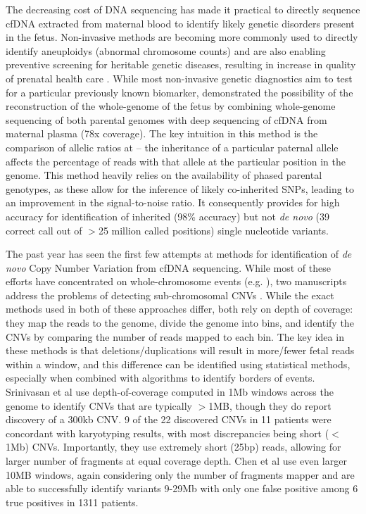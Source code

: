 The decreasing cost of DNA sequencing has made it practical to directly sequence cfDNA extracted from maternal blood to identify likely genetic disorders present in the fetus.  Non-invasive methods are becoming more commonly used to directly identify aneuploidys (abnormal chromosome counts) and are also enabling preventive screening for heritable genetic diseases, resulting in increase in quality of prenatal health care \cite{saunders2012}.  While most non-invasive genetic diagnostics aim to test for a particular previously known biomarker,  \cite{kitzman2012} demonstrated the possibility of the reconstruction of the whole-genome of the fetus by combining whole-genome sequencing of both parental genomes with deep sequencing of cfDNA from maternal plasma (78x coverage). The key intuition in this method is the comparison of allelic ratios at  -- the inheritance of a particular paternal allele affects the percentage of reads with that allele at the particular position in the genome.  This method heavily relies on the availability of phased parental genotypes, as these allow for the inference of likely co-inherited SNPs, leading to an improvement in the signal-to-noise ratio. It consequently provides for high accuracy for identification of inherited (98\% accuracy) but not \emph{de novo}  (39 correct call out of $>$25 million called positions) single nucleotide variants.

The past year has seen the first few attempts at methods for identification of \emph{de novo}  Copy Number Variation from cfDNA sequencing. While most of these efforts have concentrated on whole-chromosome events (e.g. \cite{chu2009}), two manuscripts address the problems of detecting sub-chromosomal CNVs \cite{chen2013, srinivasan2013}. While the exact methods used in both of these approaches differ, both rely on depth of coverage:  they map the reads to the genome, divide the genome into bins, and identify the CNVs by comparing the number of reads mapped to each bin. The key idea in these methods is that deletions/duplications will result in more/fewer fetal reads within a window, and this difference can be identified using statistical methods, especially when combined with algorithms to identify borders of events. Srinivasan et al use depth-of-coverage computed in 1Mb windows across the genome to identify CNVs that are typically $>$1MB, though they do report discovery of a 300kb CNV. 9 of the 22 discovered CNVs in 11 patients were concordant with karyotyping results, with most discrepancies being short ($<$1Mb) CNVs. Importantly, they use extremely short (25bp) reads, allowing for larger number of fragments at equal coverage depth. Chen et al use even larger 10MB windows, again considering only the number of fragments mapper  and are able to successfully identify variants 9-29Mb with only one false positive among 6 true positives in 1311 patients.

